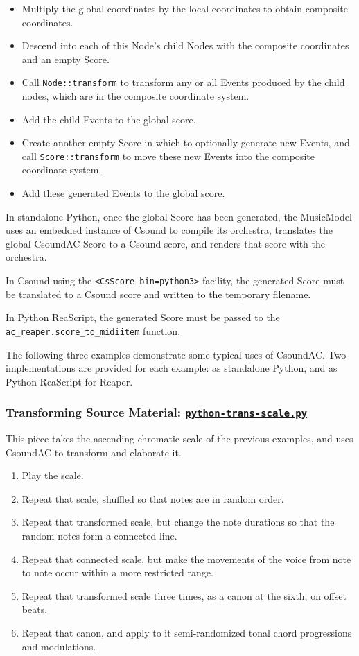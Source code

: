 \documentclass[letterpaper,10pt,DIV=12,parskip=half]{scrartcl}
\begin{document}
\begin{itemize}
\item Multiply the global coordinates by the local coordinates to obtain composite coordinates.
\item Descend into each of this Node's child Nodes with the composite coordinates and an empty Score.
\item Call \lstinline|Node::transform| to transform any or all Events produced by the child nodes, which are in the composite coordinate system.
\item Add the child Events to the global score.
\item Create another empty Score in which to optionally generate new Events, and call \lstinline|Score::transform| to move these new Events into the composite coordinate system.
\item Add these generated Events to the global score.
\end{itemize}

In standalone Python, once the global Score has been generated, the MusicModel uses an embedded instance of Csound to compile its orchestra, translates the global CsoundAC Score to a Csound score, and renders that score with the orchestra.

In Csound using the \lstinline|<CsScore bin=python3>| facility, the generated Score must be translated to a Csound score and written to the temporary filename.

In Python ReaScript, the generated Score must be passed to the \lstinline|ac_reaper.score_to_midiitem| function.

The following three examples demonstrate some typical uses of CsoundAC. Two implementations are provided for each example: as standalone Python, and as Python ReaScript for Reaper.

\subsubsection{Transforming Source Material: \href{https://github.com/gogins/csound-ac/blob/master/user-guide/python-trans-scale.py}{\lstinline|python-trans-scale.py|}}

This piece takes the ascending chromatic scale of the previous examples, and uses CsoundAC to transform and elaborate it. 

\begin{enumerate}
\item Play the scale.
\item Repeat that scale, shuffled so that notes are in random order.
\item Repeat that transformed scale, but change the note durations so that the random notes form a connected line.
\item Repeat that connected scale, but make the movements of the voice from note to note occur within a more restricted range.
\item Repeat that transformed scale three times, as a canon at the sixth, on offset beats.
\item Repeat that canon, and apply to it semi-randomized tonal chord progressions and modulations.
\end{enumerate}
\end{document}
